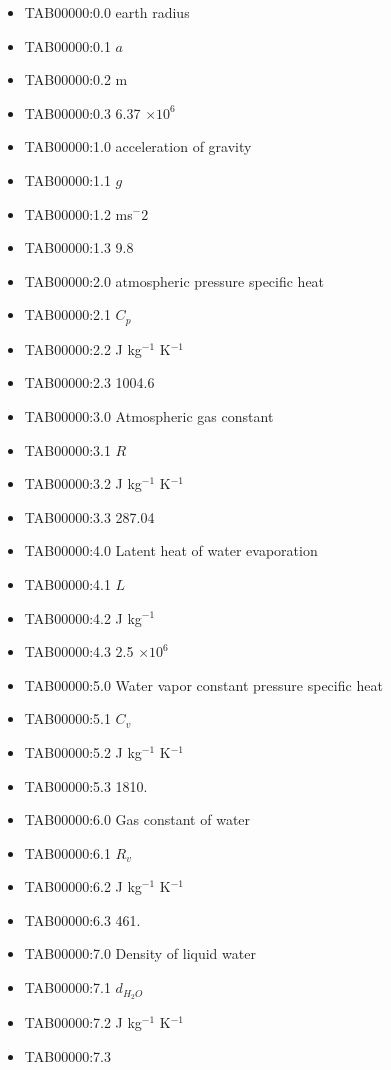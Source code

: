\begin{itemize}
\item
  TAB00000:0.0 earth radius
\item
  TAB00000:0.1 \(a\)
\item
  TAB00000:0.2 m
\item
  TAB00000:0.3 6.37 \(\times 10^6\)
\item
  TAB00000:1.0 acceleration of gravity
\item
  TAB00000:1.1 \(g\)
\item
  TAB00000:1.2 ms\(^-2\)
\item
  TAB00000:1.3 9.8
\item
  TAB00000:2.0 atmospheric pressure specific heat
\item
  TAB00000:2.1 \(C_p\)
\item
  TAB00000:2.2 J kg\(^{-1}\) K\(^{-1}\)
\item
  TAB00000:2.3 1004.6
\item
  TAB00000:3.0 Atmospheric gas constant
\item
  TAB00000:3.1 \(R\)
\item
  TAB00000:3.2 J kg\(^{-1}\) K\(^{-1}\)
\item
  TAB00000:3.3 287.04
\item
  TAB00000:4.0 Latent heat of water evaporation
\item
  TAB00000:4.1 \(L\)
\item
  TAB00000:4.2 J kg\(^{-1}\)
\item
  TAB00000:4.3 2.5 \(\times 10^6\)
\item
  TAB00000:5.0 Water vapor constant pressure specific heat
\item
  TAB00000:5.1 \(C_v\)
\item
  TAB00000:5.2 J kg\(^{-1}\) K\(^{-1}\)
\item
  TAB00000:5.3 1810\bsp.
\item
  TAB00000:6.0 Gas constant of water
\item
  TAB00000:6.1 \(R_v\)
\item
  TAB00000:6.2 J kg\(^{-1}\) K\(^{-1}\)
\item
  TAB00000:6.3 461.
\item
  TAB00000:7.0 Density of liquid water
\item
  TAB00000:7.1 \(d_{H_2O}\)
\item
  TAB00000:7.2 J kg\(^{-1}\) K\(^{-1}\)
\item
  TAB00000:7.3


\end{itemize}
